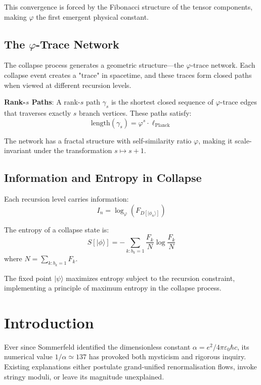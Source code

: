 \documentclass[%
 reprint,
 amsmath,amssymb,
 aps,
 prd,
 10pt,
 nofootinbib,      %
 longbibliography  %
]{revtex4-2}
\theoremstyle{definition}
\theoremstyle{remark}
\begin{document}
This convergence is forced by the Fibonacci structure of the tensor components, making $\varphi$ the first emergent physical constant.

\subsection{The \texorpdfstring{$\varphi$}{phi}-Trace Network}

The collapse process generates a geometric structure—the $\varphi$-trace network. Each collapse event creates a "trace" in spacetime, and these traces form closed paths when viewed at different recursion levels.

\textbf{Rank-$s$ Paths}: A rank-$s$ path $\gamma_s$ is the shortest closed sequence of $\varphi$-trace edges that traverses exactly $s$ branch vertices. These paths satisfy:
\begin{equation}
\text{length}(\gamma_s) = \varphi^s \cdot \ell_{\text{Planck}}
\end{equation}

The network has a fractal structure with self-similarity ratio $\varphi$, making it scale-invariant under the transformation $s \mapsto s+1$.

\subsection{Information and Entropy in Collapse}

Each recursion level carries information:
\begin{equation}
I_n = \log_\varphi(F_{D[|\phi_n\rangle]})
\end{equation}

The entropy of a collapse state is:
\begin{equation}
S[|\phi\rangle] = -\sum_{k: b_k=1} \frac{F_k}{N} \log \frac{F_k}{N}
\end{equation}
where $N = \sum_{k: b_k=1} F_k$.

The fixed point $|\psi\rangle$ maximizes entropy subject to the recursion constraint, implementing a principle of maximum entropy in the collapse process.

\section{Introduction}\label{sec:intro}

Ever since Sommerfeld identified the dimensionless constant
\(\alpha = e^2/4\pi\varepsilon_0\hbar c\),
its numerical value
\(1/\alpha \simeq 137\)
has provoked both mysticism and rigorous inquiry.
Existing explanations either
postulate grand-unified renormalisation flows,
invoke stringy moduli,
or leave its magnitude unexplained.
\end{document}
